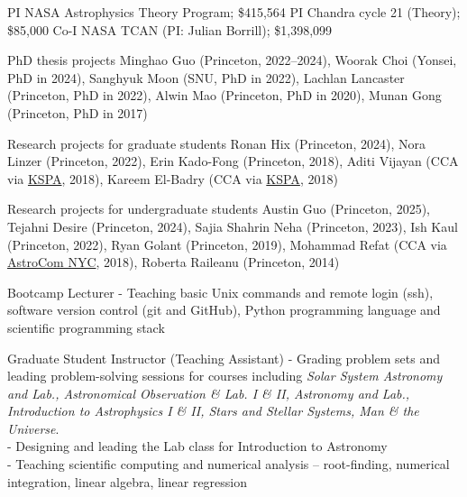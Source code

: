 \documentclass[12pt]{article}
\begin{document}

{PI}
{NASA Astrophysics Theory Program; \$415,564}
{PI}
{Chandra cycle 21 (Theory); \$85,000}
{Co-I}
{NASA TCAN (PI: Julian Borrill); \$1,398,099}



{PhD thesis projects}
{Minghao Guo (Princeton, 2022--2024), Woorak Choi (Yonsei, PhD in 2024),  Sanghyuk Moon (SNU, PhD in 2022),  Lachlan Lancaster (Princeton, PhD in 2022),  Alwin Mao (Princeton, PhD in 2020),  Munan Gong (Princeton, PhD in 2017)}

{Research projects for graduate students}
{Ronan Hix (Princeton, 2024), Nora Linzer (Princeton, 2022),  Erin Kado-Fong (Princeton, 2018),  Aditi Vijayan (CCA via \href{https://kspa.soe.ucsc.edu/archives/2018}{KSPA}, 2018),  Kareem El-Badry (CCA via \href{https://kspa.soe.ucsc.edu/archives/2018}{KSPA}, 2018)}

{Research projects for undergraduate students}
{Austin Guo (Princeton, 2025), Tejahni Desire (Princeton, 2024), Sajia Shahrin Neha (Princeton, 2023), Ish Kaul (Princeton, 2022),  Ryan Golant (Princeton, 2019),  Mohammad Refat (CCA via \href{http://cunyastro.org/astrocom/}{AstroCom NYC}, 2018),  Roberta Raileanu (Princeton, 2014)}



{Bootcamp Lecturer}
{- Teaching basic Unix commands and remote login (ssh), software version control (git and GitHub), Python programming language and scientific programming stack}

{Graduate Student Instructor (Teaching Assistant)}
{- Grading problem sets and leading problem-solving sessions for courses including \emph{Solar System Astronomy and Lab., Astronomical Observation \& Lab. I \& II, Astronomy and Lab., Introduction to Astrophysics I \& II, Stars and Stellar Systems, Man \& the Universe}. \\ - Designing and leading the Lab class for Introduction to Astronomy\\- Teaching scientific computing and numerical analysis -- root-finding, numerical integration, linear algebra, linear regression}
\end{document}
